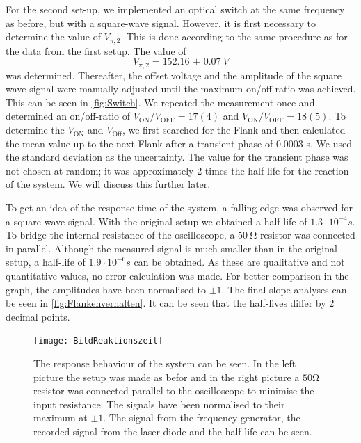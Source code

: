 For the second set-up, we implemented an optical switch at the same frequency as before, but with a square-wave signal. However, it is first necessary to determine the value of $V_{\pi,2}$. This is done according to the same procedure as for the data from the first setup. The value of 
$$V_{\pi,2}=\SI{152.16(7)}{V}$$
was determined. Thereafter, the offset voltage and the amplitude of the square wave signal were manually adjusted until the maximum on/off ratio was achieved. This can be seen in  \autoref{fig:Switch}. We repeated the measurement once and determined an on/off-ratio of $V_\mathrm{ON}/V_\mathrm{OFF}=17(4) $ and $V_\mathrm{ON}/V_\mathrm{OFF}=18(5)$. To determine the $V_\mathrm{ON}$ and $V_\mathrm{Off}$, we first searched for the Flank and then calculated the mean value up to the next Flank after a transient phase of 0.0003 s. We used the standard deviation as the uncertainty. The value for the transient phase was not chosen at random; it was approximately 2 times the half-life for the reaction of the system. We will discuss this further later.


To get an idea of the response time of the system, a falling edge was observed for a square wave signal. With the original setup we obtained a half-life of $1.3\cdot 10^{-4} \unit{s}$. To bridge the internal resistance of the oscilloscope, a $50\:\unit{\ohm}$ resistor was connected in parallel. Although the measured signal is much smaller than in the original setup, a half-life of $1.9\cdot 10^{-6} \unit {s}$ can be obtained. As these are qualitative and not quantitative values, no error calculation was made. For better comparison in the graph, the amplitudes have been normalised to $\pm 1$. The final slope analyses can be seen in \autoref{fig:Flankenverhalten}. It can be seen that the half-lives differ by 2 decimal points.

\begin{figure}[H]
	\centering
	\texttt{[image: BildReaktionszeit]}
	\caption{The response behaviour of the system can be seen. In the left picture the setup was made as befor and in the right picture a $50 \unit{\ohm}$ resistor was connected parallel to the oscilloscope to minimise the input resistance. The signals have been normalised to their maximum at $\pm 1$. The signal from the frequency generator, the recorded signal from the laser diode and the half-life can be seen.}
	\label{fig:Flankenverhalten}
\end{figure}






